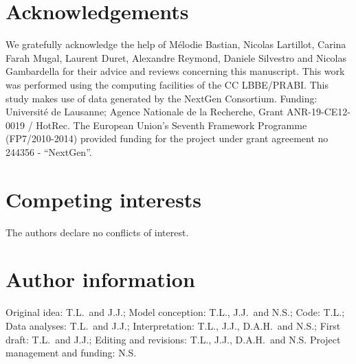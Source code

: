 \documentclass{article}
\begin{document}
    \section*{Acknowledgements}
    \label{sec:acknowledgment}
    We gratefully acknowledge the help of Mélodie Bastian, Nicolas Lartillot, Carina Farah Mugal, Laurent Duret, Alexandre Reymond, Daniele Silvestro and Nicolas Gambardella for their advice and reviews concerning this manuscript.
    This work was performed using the computing facilities of the CC LBBE/PRABI\@.
    This study makes use of data generated by the NextGen Consortium.
    Funding:
    Université de Lausanne; Agence Nationale de la Recherche, Grant ANR-19-CE12-0019 / HotRec.
    The European Union’s Seventh Framework Programme (FP7/2010-2014) provided funding for the project under grant agreement no 244356 - “NextGen”.

    \section*{Competing interests}
    The authors declare no conflicts of interest.

    \section*{Author information}
    Original idea: T.L.\ and J.J.;
    Model conception: T.L., J.J.\ and N.S.;
    Code: T.L.;
    Data analyses: T.L.\ and J.J.;
    Interpretation: T.L., J.J., D.A.H.\ and N.S.;
    First draft: T.L.\ and J.J.;
    Editing and revisions: T.L., J.J., D.A.H.\ and N.S.
    Project management and funding: N.S\@.
\end{document}
